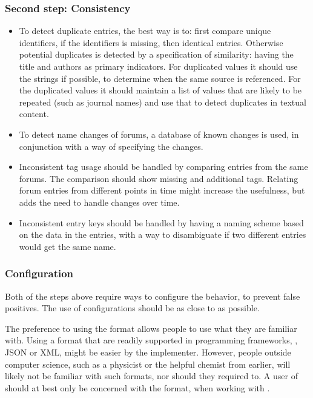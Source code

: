 \subsubsection{Second step: Consistency}
\begin{itemize}
\item To detect duplicate entries, the best way is to: first compare
  unique identifiers, if the identifiers is missing, then identical
  entries.  Otherwise potential duplicates is detected by a
  specification of similarity: having the title and authors as primary
  indicators.  For duplicated values it should use the strings if
  possible, to determine when the same source is referenced.  For the
  duplicated values it should maintain a list of values that are
  likely to be repeated (such as journal names) and use that to detect
  duplicates in textual content.

\item To detect name changes of forums, a database of known changes is
  used, in conjunction with a way of specifying the changes.

\item Inconsistent tag usage should be handled by comparing entries
  from the same forums.  The comparison should show missing and
  additional tags.  Relating forum entries from different points in
  time might increase the usefulness, but adds the need to handle
  changes over time.

\item Inconsistent entry keys should be handled by having a naming
  scheme based on the data in the entries, with a way to disambiguate
  if two different entries would get the same name.
\end{itemize}


\subsubsection{Configuration}
\label{sec:analyzing_configuration}

Both of the steps above require ways to configure the behavior, to
prevent false positives.  The use of configurations should be as close
to {\bibtex} as possible.

The preference to using the {\bibtex} format allows people to use what
they are familiar with.  Using a format that are readily supported in
programming frameworks, \eg, JSON or XML, might be easier by the
implementer.  However, people outside computer science, such as a
physicist or the helpful chemist from earlier, will likely not be
familiar with such formats, nor should they required to.  A user of
{\bibtex} should at best only be concerned with the {\bibtex} format,
when working with {\bibtex}.

